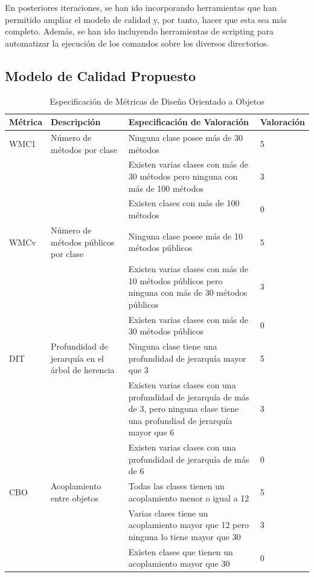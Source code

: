 \documentclass[11pt]{article}
\begin{document}
En posteriores iteraciones, se han ido incorporando herramientas que han permitido ampliar el modelo de calidad y, por tanto, hacer que esta sea más completo. Además, se han ido incluyendo herramientas de scripting para automatizar la ejecución de los comandos sobre los diversos directorios.

\subsection{Modelo de Calidad Propuesto}

\begin{table}[H]
  \begin{center}
    \begin{tabular}{ | p{1.6cm} | p{3cm} | p{8cm} | p{2cm} | }
    \toprule
    \textbf{Métrica} & \textbf{Descripción} & \textbf{Especificación de Valoración} & \textbf{Valoración} \\
    \hline
    WMC1 & Número de métodos por clase & Ninguna clase posee más de 30 métodos & 5 \\ \cline{3-3} \cline{4-4} 
    & & Existen varias clases con más de 30 métodos pero ninguna con más de 100 métodos & 3 \\ \cline{3-3}\cline{4-4}
    & & Existen clases con más de 100 métodos & 0 \\ \cline{3-3}\cline{4-4}
    \hline
    WMCv & Número de métodos públicos por clase & Ninguna clase posee más de 10 métodos públicos & 5 \\ \cline{3-3} \cline{4-4} 
    & & Existen varias clases con más de 10 métodos públicos pero ninguna con más de 30 métodos públicos & 3 \\ \cline{3-3}\cline{4-4}
    & & Existen varias clases con más de 30 métodos públicos & 0 \\ \cline{3-3}\cline{4-4}
    \hline
    DIT & Profundidad de jerarquía en el árbol de herencia & Ninguna clase tiene una profundidad de jerarquía mayor que 3 & 5 \\ \cline{3-3} \cline{4-4} 
    & & Existen varias clases con una profundidad de jerarquía de más de 3, pero ninguna clase tiene una profundiad de jerarquía mayor que 6 & 3 \\ \cline{3-3}\cline{4-4}
    & & Existen varias clases con una profundidad de jerarquía de más de 6  & 0 \\ \cline{3-3}\cline{4-4}
    \hline
    CBO & Acoplamiento entre objetos & Todas las clases tienen un acoplamiento menor o igual a 12 & 5 \\ \cline{3-3} \cline{4-4} 
    & & Varias clases tiene un acoplamiento mayor que 12 pero ninguna lo tiene mayor que 30 & 3 \\ \cline{3-3}\cline{4-4}
    & & Existen clases que tienen un acoplamiento mayor que 30 & 0 \\ 
    \bottomrule
    \end{tabular}
    \caption{Especificación de Métricas de Diseño Orientado a Objetos}
    \label{tab:metrics_ood}
  \end{center}
\end{table}
\end{document}
